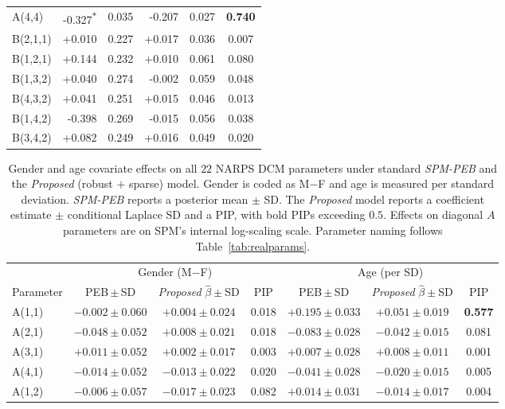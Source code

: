 \begin{table}[tbp]
\begin{tabular}{l r@{\,$\pm$\,}l r@{\,$\pm$\,}l c}
A(4,4) & -0.327\textsuperscript{$\ast$} & 0.035 & -0.207 & 0.027 & \textbf{0.740} \\
B(2,1,1) & +0.010 & 0.227 & +0.017 & 0.036 & 0.007 \\
B(1,2,1) & +0.144 & 0.232 & +0.010 & 0.061 & 0.080 \\
B(1,3,2) & +0.040 & 0.274 & -0.002 & 0.059 & 0.048 \\
B(4,3,2) & +0.041 & 0.251 & +0.015 & 0.046 & 0.013 \\
B(1,4,2) & -0.398 & 0.269 & -0.015 & 0.056 & 0.038 \\
B(3,4,2) & +0.082 & 0.249 & +0.016 & 0.049 & 0.020 \\
\bottomrule
\end{tabular}
\end{table}

\begin{table}[tbp]
\centering
\small
\caption{Gender and age covariate effects on all $22$ NARPS DCM parameters under standard \emph{SPM-PEB} and the \emph{Proposed} (robust $+$ sparse) model. Gender is coded as M$-$F and age is measured per standard deviation. \emph{SPM-PEB} reports a posterior mean $\pm$ SD. The \emph{Proposed} model reports a coefficient estimate $\pm$ conditional Laplace SD and a PIP, with bold PIPs exceeding $0.5$. Effects on diagonal $A$ parameters are on SPM's internal log-scaling scale. Parameter naming follows Table~\ref{tab:realparams}.}
\label{tab:realcov}
\setlength{\tabcolsep}{2.5pt}
\begin{tabular}{l ccc ccc}
\toprule
 & \multicolumn{3}{c}{Gender (M$-$F)} & \multicolumn{3}{c}{Age (per SD)} \\
\cmidrule(lr){2-4}\cmidrule(lr){5-7}
Parameter & PEB\,$\pm$\,SD & \emph{Proposed} $\widehat{\beta}\pm$SD & PIP & PEB\,$\pm$\,SD & \emph{Proposed} $\widehat{\beta}\pm$SD & PIP \\
\midrule
A(1,1) & $-0.002\!\pm\!0.060$ & $+0.004\!\pm\!0.024$ & 0.018 & $+0.195\!\pm\!0.033$ & $+0.051\!\pm\!0.019$ & \textbf{0.577} \\
A(2,1) & $-0.048\!\pm\!0.052$ & $+0.008\!\pm\!0.021$ & 0.018 & $-0.083\!\pm\!0.028$ & $-0.042\!\pm\!0.015$ & 0.081 \\
A(3,1) & $+0.011\!\pm\!0.052$ & $+0.002\!\pm\!0.017$ & 0.003 & $+0.007\!\pm\!0.028$ & $+0.008\!\pm\!0.011$ & 0.001 \\
A(4,1) & $-0.014\!\pm\!0.052$ & $-0.013\!\pm\!0.022$ & 0.020 & $-0.041\!\pm\!0.028$ & $-0.020\!\pm\!0.015$ & 0.005 \\
A(1,2) & $-0.006\!\pm\!0.057$ & $-0.017\!\pm\!0.023$ & 0.082 & $+0.014\!\pm\!0.031$ & $-0.014\!\pm\!0.017$ & 0.004 \\

\end{tabular}
\end{table}
